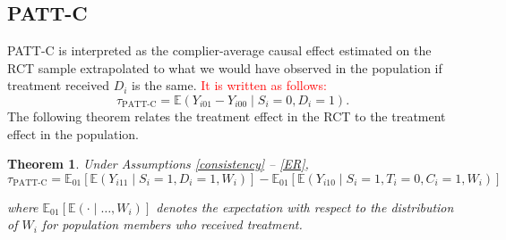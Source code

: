 \documentclass[hidelinks,12pt]{article}
\newtheorem{theorem}{Theorem}
\newcommand{\ex}{\mathbb{E}} %
\begin{document}
\subsection{PATT-C}

PATT-C is interpreted as the complier-average causal effect estimated on the RCT sample extrapolated to what we would have observed in the population if treatment received $D_i$ is the same. \textcolor{red}{It is written as follows:}
%
\begin{equation}\label{tpattc}
\tau_{\text{PATT-C}} = \ex\left( Y_{i01} - Y_{i00} \mid S_i=0, D_i=1\right).
\end{equation}
%
The following theorem relates the treatment effect in the RCT to the treatment effect in the population. 

\vskip 0.2in
\begin{theorem}\label{thm1}
Under Assumptions \eqref{consistency} -- \eqref{ER},
\begin{equation}\label{tpattc-est}
\tau_{\text{PATT-C}} = \ex_{01}\left[  \ex\left(Y_{i11} \mid S_i=1, D_i=1, W_i\right)\right]
-\ex_{01}\left[  \ex\left(Y_{i10} \mid S_i=1, T_i =0, C_i =1, W_i\right) \right] 
\end{equation}

where $\ex_{01}\left[\ex(\cdot \mid\dots, W_i)\right]$ denotes the expectation with respect to the distribution of $W_i$ for population members who received treatment.
\end{theorem}
\end{document}
